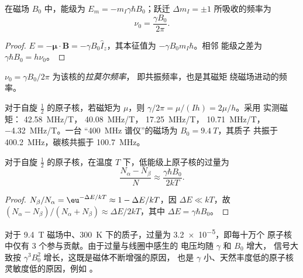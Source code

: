 \begin{proposition}[塞曼能级]\label{prop:b3:advanced-nmr:zeeman}
在磁场 $B_0$ 中，能级为 $E_m = -m_I\gamma\hbar B_0$；跃迁 $\Delta m_I = \pm1$
所吸收的频率为
\[
\nu_0 = \frac{\gamma B_0}{2\pi}.
\]
\end{proposition}

\begin{proof}
$E = -\boldsymbol\mu\cdot\mathbf B = -\gamma B_0\hat I_z$，其本征值为 $-\gamma B_0m_I\hbar$。相邻
能级之差为 $\gamma\hbar B_0 = h\nu_0$。
\end{proof}

\begin{definition}[拉莫尔频率]\label{def:b3:advanced-nmr:larmor}
$\nu_0 = \gamma B_0/2\pi$ 为该核的\emph{拉莫尔频率}，
即共振频率，也是其磁矩
绕磁场进动的频率。
\end{definition}

\begin{example}[常见原子核]\label{ex:b3:advanced-nmr:nuclei}
对于自旋 $\frac12$ 的原子核，若磁矩为 $\mu$，则 $\gamma/2\pi = \mu/(Ih) = 2\mu/h$。采用
实测磁矩： \qty{42.58}{MHz/T}， \qty{40.08}{MHz/T}，
\qty{17.25}{MHz/T}， \qty{10.71}{MHz/T}， \qty{-4.32}{MHz/T}。一台
“\qty{400}{MHz} 谱仪”的磁场为 $B_0 = \qty{9.4}{T}$，其质子
共振于 \qty{400.2}{MHz}，碳核共振于 \qty{100.7}{MHz}。
\end{example}

\begin{proposition}[能级布居的微小差异]\label{prop:b3:advanced-nmr:populations}
对于自旋 $\frac12$ 的原子核，在温度 $T$ 下，低能级上原子核的过量为
\[
\frac{N_\alpha - N_\beta}{N} \approx \frac{\gamma\hbar B_0}{2kT}.
\]
\end{proposition}

\begin{proof}
$N_\beta/N_\alpha = \eu^{-\Delta E/kT} \approx 1 - \Delta E/kT$，因 $\Delta E \ll kT$，故
$(N_\alpha - N_\beta)/(N_\alpha + N_\beta) \approx \Delta E/2kT$，其中 $\Delta E = \gamma\hbar B_0$。
\end{proof}

对于 \qty{9.4}{T} 磁场中、\qty{300}{K} 下的质子，过量为 \num{3.2e-5}，即每十万个
原子核中仅有 3 个参与贡献。由于过量与线圈中感生的
电压均随 $\gamma$ 和 $B_0$ 增大，
信号大致按 $\gamma^3B_0^2$ 增长，这既是磁体不断增强的原因，
也是 $\gamma$ 小、天然丰度低的原子核灵敏度低的原因，例如
。

